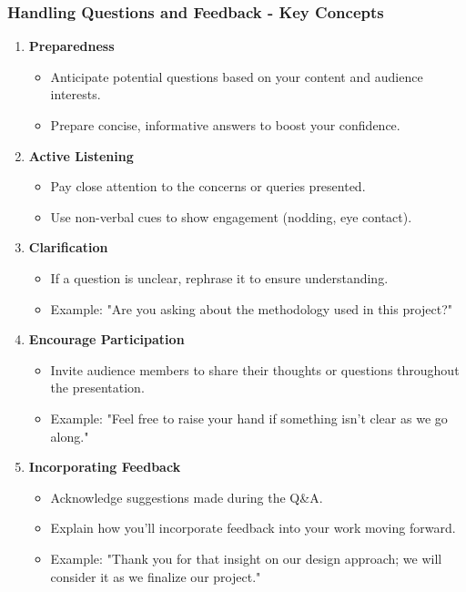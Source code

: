 \documentclass{beamer}
\begin{document}
\begin{frame}[fragile]
    \frametitle{Handling Questions and Feedback - Key Concepts}
    \begin{enumerate}
        \item \textbf{Preparedness}
        \begin{itemize}
            \item Anticipate potential questions based on your content and audience interests.
            \item Prepare concise, informative answers to boost your confidence.
        \end{itemize}
        
        \item \textbf{Active Listening}
        \begin{itemize}
            \item Pay close attention to the concerns or queries presented.
            \item Use non-verbal cues to show engagement (nodding, eye contact).
        \end{itemize}
        
        \item \textbf{Clarification}
        \begin{itemize}
            \item If a question is unclear, rephrase it to ensure understanding.
            \item Example: "Are you asking about the methodology used in this project?"
        \end{itemize}
        
        \item \textbf{Encourage Participation}
        \begin{itemize}
            \item Invite audience members to share their thoughts or questions throughout the presentation.
            \item Example: "Feel free to raise your hand if something isn't clear as we go along."
        \end{itemize}
        
        \item \textbf{Incorporating Feedback}
        \begin{itemize}
            \item Acknowledge suggestions made during the Q\&A.
            \item Explain how you'll incorporate feedback into your work moving forward.
            \item Example: "Thank you for that insight on our design approach; we will consider it as we finalize our project."
        \end{itemize}
    \end{enumerate}
\end{frame}
\end{document}
